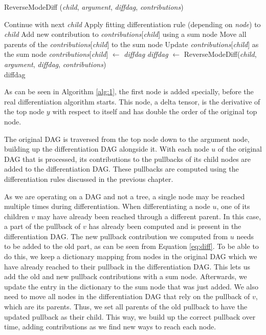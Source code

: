 \documentclass[12pt, a4paper]{report}
\begin{document}
\begin{algorithm}
    \caption{ReverseModeDiff (\textit{child}, \textit{argument}, \textit{diffdag}, \textit{contributions})}\label{alg:2}
    \begin{algorithmic}
                \State Continue with next \textit{child}
            \EndIf
            \State Apply fitting differentiation rule (depending on \textit{node}) to \textit{child}
                \State Add new contribution to \textit{contributions}[\textit{child}] using a sum node
                \State Move all parents of the \textit{contributions}[\textit{child}] to the sum node
                \State Update \textit{contributions}[\textit{child}] as the sum node
            \Else
                \State \textit{contributions}[\textit{child}] $\gets$ \textit{diffdag}
                \State \textit{diffdag} $\gets$ ReverseModeDiff(\textit{child}, \textit{argument}, \textit{diffdag}, \textit{contributions})
            \EndIf
        \EndFor \\
        \Return diffdag
    \end{algorithmic}
\end{algorithm}

As can be seen in Algorithm \ref{alg:1}, the first node is added specially, before the real differentiation algorithm starts.
This node, a delta tensor, is the derivative of the top node $y$ with respect to itself and has double the order of the original top node.

The original DAG is traversed from the top node down to the argument node, building up the differentiation DAG alongside it.
With each node $u$ of the original DAG that is processed, its contributions to the pullbacks of its child nodes are added to the differentiation DAG.
These pullbacks are computed using the differentiation rules discussed in the previous chapter.

As we are operating on a DAG and not a tree, a single node may be reached multiple times during differentiation.
When differentiating a node $u$, one of its children $v$ may have already been reached through a different parent.
In this case, a part of the pullback of $v$ has already been computed and is present in the differentiation DAG.
The new pullback contribution we computed from $u$ needs to be added to the old part, as can be seen from Equation \ref{eq:diff}.
To be able to do this, we keep a dictionary mapping from nodes in the original DAG which we have already reached to their pullback in the differentiation DAG.
This lets us add the old and new pullback contributions with a sum node.
Afterwards, we update the entry in the dictionary to the sum node that was just added.
We also need to move all nodes in the differentiation DAG that rely on the pullback of $v$, which are its parents.
Thus, we set all parents of the old pullback to have the updated pullback as their child.
This way, we build up the correct pullback over time, adding contributions as we find new ways to reach each node.
\end{document}
